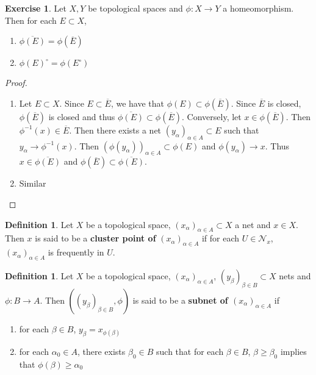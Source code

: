 \documentclass[12pt]{amsart}
\theoremstyle{definition}
\newtheorem{defn}[definition]{Definition}
\newtheorem{ex}[definition]{Exercise}
\newcommand{\al}{\alpha}
\newcommand{\be}{\beta}
\newcommand{\MN}{\mathcal{N}}
\newcommand{\lex}[1]{\label{ex:#1}}
\newcommand{\ld}[1]{\label{defn:#1}}
\begin{document}
	\begin{ex} \lex{33013}
		Let $X, Y$ be topological spaces and $\phi: X \rightarrow Y$ a homeomorphism. Then for each $E \subset X$, 
		\begin{enumerate}
			\item $\overline{\phi(E)} = \phi(\overline{E})$  \item $\phi(E)^{\circ} = \phi(E^{\circ})$  
		\end{enumerate} 
	\end{ex}
	
	\begin{proof}\
		\begin{enumerate}
			\item Let $E \subset X$. Since $E \subset \overline{E}$, we have that $\phi(E) \subset \phi(\overline{E})$. Since $\overline{E}$ is closed, $\phi(\overline{E})$ is closed and thus $\overline{\phi(E)} \subset \phi(\overline{E})$. Conversely, let $x \in \phi(\overline{E})$. Then $\phi^{-1}(x) \in \overline{E}$. Then there exists a net $( y_{\al} )_{\al \in A} \subset E$ such that $y_{\al} \rightarrow \phi^{-1}(x)$. Then $( \phi(y_{\al}) )_{\al \in A } \subset \phi(E)$ and $\phi(y_{\al}) \rightarrow x$. Thus $x \in \overline{\phi(E)}$ and $\phi(\overline{E}) \subset \overline{\phi(E)}$.
			\item Similar
		\end{enumerate} 
	\end{proof}

	\begin{defn}
		Let $X$ be a topological space, $(x_{\al})_{\al \in A} \subset X$ a net and $x \in X$. Then $x$ is said to be a \textbf{cluster point of} $(x_{\al})_{\al \in A}$ if for each $U \in \MN_x$, $(x_{\al})_{\al \in A}$ is frequently in $U$.
	\end{defn}
	
	\begin{defn} \ld{33014}
	Let $X$ be a topological space, $(x_{\al})_{\al \in A}$, $(y_{\be})_{\be \in B} \subset X$ nets and $\phi:B \rightarrow A$. 
	Then $((y_{\be})_{\be \in B}, \phi)$ is said to be a \textbf{subnet of $(x_{\al})_{\al \in A}$} if 
	\begin{enumerate}
		\item for each $\beta \in B$, $y_{\beta} = x_{\phi(\beta)}$
		\item for each $\al_0 \in A$, there exists $\be_0 \in B$ such that for each $\be \in B$, $\be \geq \be_0$ implies that $\phi(\be) \geq \al_0$
	\end{enumerate}
	\end{defn}
	
\end{document}
